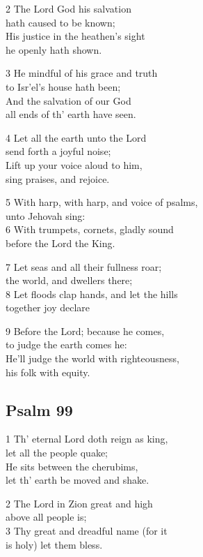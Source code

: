 2 The Lord God his salvation\\
hath caused to be known;\\
His justice in the heathen’s sight\\
he openly hath shown.

3 He mindful of his grace and truth\\
to Isr’el’s house hath been;\\
And the salvation of our God\\
all ends of th’ earth have seen.

4 Let all the earth unto the Lord\\
send forth a joyful noise;\\
Lift up your voice aloud to him,\\
sing praises, and rejoice.

5 With harp, with harp, and voice of psalms,\\
unto Jehovah sing:\\
6 With trumpets, cornets, gladly sound\\
before the Lord the King.

7 Let seas and all their fullness roar;\\
the world, and dwellers there;\\
8 Let floods clap hands, and let the hills\\
together joy declare

9 Before the Lord; because he comes,\\
to judge the earth comes he:\\
He’ll judge the world with righteousness,\\
his folk with equity.

\begin{center}
\quad{}\quad{}
\end{center}

\subsection*{Psalm 99}

1 Th’ eternal Lord doth reign as king,\\
let all the people quake;\\
He sits between the cherubims,\\
let th’ earth be moved and shake.

2 The Lord in Zion great and high\\
above all people is;\\
3 Thy great and dreadful name (for it\\
is holy) let them bless.

